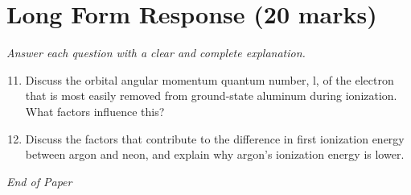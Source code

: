 \documentclass[12pt]{article}
\begin{document}
\section*{Long Form Response (20 marks)}
\textit{Answer each question with a clear and complete explanation.}
\begin{enumerate}[label=\arabic*.]
\setcounter{enumi}{10}
\item Discuss the orbital angular momentum quantum number, l, of the electron that is most easily removed from ground-state aluminum during ionization. What factors influence this?
\item Discuss the factors that contribute to the difference in first ionization energy between argon and neon, and explain why argon's ionization energy is lower.
\end{enumerate}

\vfill
\noindent\textit{End of Paper}
\end{document}
